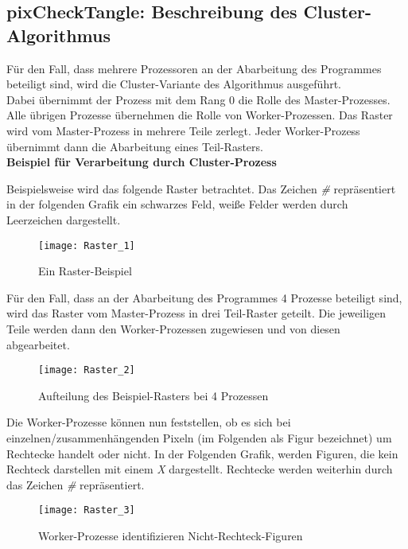 \documentclass[
10pt, %
a4paper, %
oneside, %
headinclude,footinclude, %
BCOR5mm, %
]{scrartcl}
\begin{document}
\subsection{pixCheckTangle: Beschreibung des Cluster-Algorithmus}

Für den Fall, dass mehrere Prozessoren an der Abarbeitung des Programmes beteiligt sind, wird die Cluster-Variante des Algorithmus ausgeführt.\\
Dabei übernimmt der Prozess mit dem Rang 0 die Rolle des Master-Prozesses. Alle übrigen Prozesse übernehmen die Rolle von Worker-Prozessen. Das Raster wird vom Master-Prozess in mehrere Teile zerlegt. Jeder Worker-Prozess übernimmt dann die Abarbeitung eines Teil-Rasters. \\

\textbf{Beispiel für Verarbeitung durch Cluster-Prozess}

Beispielsweise wird das folgende Raster betrachtet. Das Zeichen \textit{\#} repräsentiert in der folgenden Grafik ein schwarzes Feld, weiße Felder werden durch Leerzeichen dargestellt.
\begin{figure}[h]
	\centering 
	\texttt{[image: Raster\_1]} 
	\caption[Cluster-Prozess: Beispiel-Raster]{Ein Raster-Beispiel }
\end{figure}

Für den Fall, dass an der Abarbeitung des Programmes 4 Prozesse beteiligt sind, wird das Raster vom Master-Prozess in drei Teil-Raster geteilt. Die jeweiligen Teile werden dann den Worker-Prozessen zugewiesen und von diesen abgearbeitet.

\begin{figure}[h]
	\centering 
	\texttt{[image: Raster\_2]} 
	\caption[Cluster-Prozess: Aufteilung Beispiel-Raster mit 4 Prozessen]{Aufteilung des Beispiel-Rasters bei 4 Prozessen}
\end{figure}

Die Worker-Prozesse können nun feststellen, ob es sich bei einzelnen/zusammenhängenden Pixeln (im Folgenden als Figur bezeichnet) um Rechtecke handelt oder nicht. In der Folgenden Grafik, werden Figuren, die kein Rechteck darstellen mit einem \textit{X} dargestellt. Rechtecke werden weiterhin durch das Zeichen \textit{\#} repräsentiert.

\begin{figure}[h]
	\centering 
	\texttt{[image: Raster\_3]} 
	\caption[Cluster-Prozess: Worker-Prozess: Nicht-Rechteck-Figuren]{Worker-Prozesse identifizieren Nicht-Rechteck-Figuren}
\end{figure}
\end{document}
